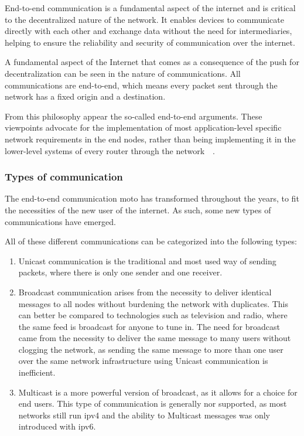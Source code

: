
End-to-end communication is a fundamental aspect of the internet and is critical to the decentralized nature of the network. It enables devices to communicate directly with each other and exchange data without the need for intermediaries, helping to ensure the reliability and security of communication over the internet.

A fundamental aspect of the Internet that comes as a consequence of the push for decentralization can be seen in the nature of communications. All communications are end-to-end, which means every packet sent through the network has a fixed origin and a destination. 

From this philosophy appear the so-called end-to-end arguments. These viewpoints advocate for the implementation of most application-level specific network requirements in the end nodes, rather than being implementing it in the lower-level systems of every router through the network~\cite{saltzer_end--end_1984}~\cite{moors_critical_2002}.

\subsubsection{Types of communication}
The end-to-end communication moto has transformed throughout the years, to fit the necessities of the new user of the internet. As such, some new types of communications have emerged.

All of these different communications can be categorized into the following types:
\begin{enumerate}

    \item Unicast communication is the traditional and most used way of sending packets, where there is only one sender and one receiver.
    \item Broadcast communication arises from the necessity to deliver identical messages to all nodes without burdening the network with duplicates. This can better be compared to technologies such as television and radio, where the same feed is broadcast for anyone to tune in. The need for broadcast came from the necessity to deliver the same message to many users without clogging the network, as sending the same message to more than one user over the same network infrastructure using Unicast communication is inefficient.
    \item Multicast is a more powerful version of broadcast, as it allows for a choice for end users. This type of communication is generally nor supported, as most networks still run \gls{ipv4} and the ability to Multicast messages was only introduced with \gls{ipv6}.

\end{enumerate}

